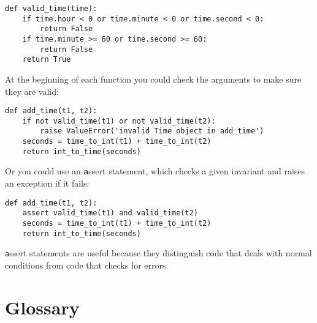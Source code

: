 \documentclass[
DIV=11,
fontsize=13,
twoside,
headinclude=false,
titlepage=firstiscover,
abstract=true,
headsepline=true,
footsepline=true,
chapterprefix=true, %
headings=big,
bibliography=totoc,%
captions=tableheading
]{scrbook}
\theoremstyle{definition}
\begin{document}
\begin{lstlisting}
def valid_time(time):
    if time.hour < 0 or time.minute < 0 or time.second < 0:
        return False
    if time.minute >= 60 or time.second >= 60:
        return False
    return True
\end{lstlisting}
%
At the beginning of each function you could check the
arguments to make sure they are valid:

\begin{lstlisting}
def add_time(t1, t2):
    if not valid_time(t1) or not valid_time(t2):
        raise ValueError('invalid Time object in add_time')
    seconds = time_to_int(t1) + time_to_int(t2)
    return int_to_time(seconds)
\end{lstlisting}
%
Or you could use an {\textbf assert statement}, which checks a given invariant
and raises an exception if it fails:

\begin{lstlisting}
def add_time(t1, t2):
    assert valid_time(t1) and valid_time(t2)
    seconds = time_to_int(t1) + time_to_int(t2)
    return int_to_time(seconds)
\end{lstlisting}
%
{\texttt assert} statements are useful because they distinguish
code that deals with normal conditions from code
that checks for errors.


\section{Glossary}
\end{document}
